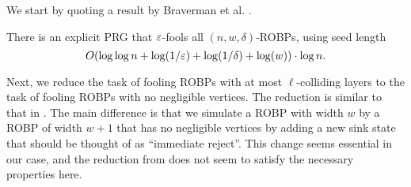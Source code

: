 We start by quoting a result by Braverman et al. \cite{BravermanRRY10}.

\begin{theorem}\label{thm:BRRY}
There is an explicit PRG that  $\varepsilon$-fools all $(n,w,\delta)$-ROBPs, using seed length
$$O(\log \log n + \log(1/\varepsilon) + \log(1/\delta) + \log(w)) \cdot \log n.$$
\end{theorem}

Next, we reduce the task of fooling ROBPs with at most $\ell$-colliding layers to the task of fooling ROBPs with no negligible vertices.
The reduction is similar to that in \cite{CHRT17}. The main difference is that we simulate a ROBP with width $w$ by a ROBP of width $w+1$ that has no negligible vertices by adding a new sink state that should be thought of as ``immediate reject''. 
This change seems essential in our case, and the reduction from \cite{CHRT17} does not seem to satisfy the necessary properties here.



